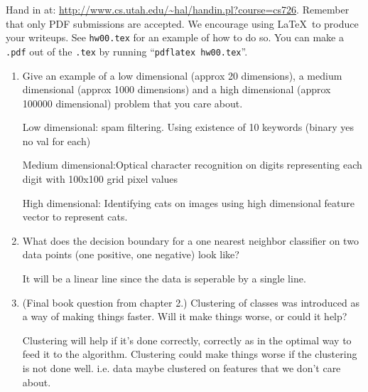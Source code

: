 \documentclass[fleqn]{article}
\begin{document}


Hand in at: \url{http://www.cs.utah.edu/~hal/handin.pl?course=cs726}.
Remember that only PDF submissions are accepted.  We encourage using
\LaTeX\ to produce your writeups.  See \verb+hw00.tex+ for an example
of how to do so.  You can make a \verb+.pdf+ out of the \verb+.tex+ by
running ``\verb+pdflatex hw00.tex+''.

\begin{enumerate}
\item Give an example of a low dimensional (approx 20 dimensions), a
  medium dimensional (approx 1000 dimensions) and a high dimensional
  (approx 100000 dimensional) problem that you care about.

\begin{solution}
  Low dimensional: spam filtering. Using existence of 10 keywords
  (binary yes no val for each)

  Medium dimensional:Optical character recognition on digits
  representing each digit with 100x100 grid pixel values

  High dimensional:  Identifying cats on images using high dimensional feature vector to represent cats.
\end{solution}  

\item What does the decision boundary for a one nearest neighbor
  classifier on two data points (one positive, one negative) look
  like?

\begin{solution}
  It will be a linear line since the data is seperable by a single line.
\end{solution}  

\item (Final book question from chapter 2.)  Clustering of classes was
  introduced as a way of making things faster.  Will it make things
  worse, or could it help?

\begin{solution}
  Clustering will help if it's done correctly, correctly as in the
  optimal way to feed it to the algorithm. Clustering could make
  things worse if the clustering is not done well. i.e. data maybe
  clustered on features that we don't care about.
\end{solution}  


\end{enumerate}
\end{document}
